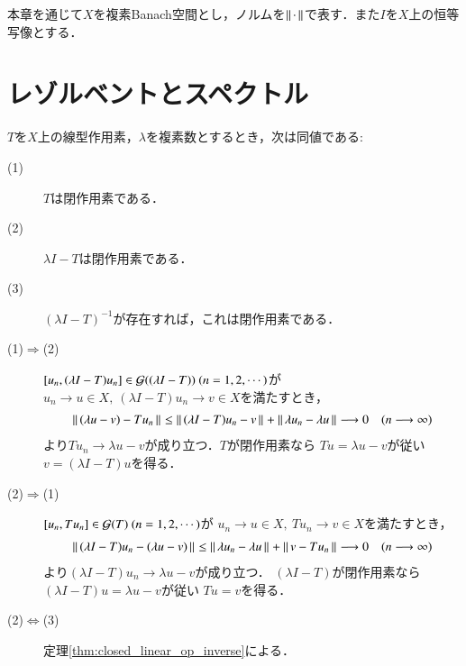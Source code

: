 本章を通じて$X$を複素Banach空間とし，ノルムを$\left\|\, \cdot\, \right\|_{}$で表す．また$I$を$X$上の恒等写像とする．

\section{レゾルベントとスペクトル}
	\begin{screen}
		\begin{lem}[レゾルベントは閉作用素]
			$T$を$X$上の線型作用素，$\lambda$を複素数とするとき，次は同値である:
			\begin{description}
				\item[(1)] $T$は閉作用素である．
				\item[(2)] $\lambda I - T$は閉作用素である．
				\item[(3)] $(\lambda I - T)^{-1}$が存在すれば，これは閉作用素である．
			\end{description}
		\end{lem}
	\end{screen}
	
	\begin{prf}\mbox{}
		\begin{description}
			\item[(1)$\Rightarrow$(2)]
				$[u_n,(\lambda I - T) u_n] \in \Graph{(\lambda I - T)} \ (n=1,2,\cdots)$が
				$u_n \longrightarrow u \in X,\ (\lambda I - T) u_n \longrightarrow v \in X$を満たすとき，
				\begin{align}
					\left\|\, (\lambda u - v) - T u_n\, \right\|_{}
					\leq \left\|\, (\lambda I - T) u_n - v\, \right\|_{} + \left\|\, \lambda u_n - \lambda u\, \right\|_{}
					\longrightarrow 0 \quad (n \longrightarrow \infty)
				\end{align}
				より$T u_n \longrightarrow \lambda u - v$が成り立つ．$T$が閉作用素なら
				$T u = \lambda u - v$が従い$v = (\lambda I - T) u$を得る．
				
			\item[(2)$\Rightarrow$(1)]
				$[u_n,T u_n] \in \Graph{T} \ (n=1,2,\cdots)$が
				$u_n \longrightarrow u \in X,\ T u_n \longrightarrow v \in X$を満たすとき，
				\begin{align}
					\left\|\, (\lambda I - T)u_n - (\lambda u - v)\, \right\|_{}
					\leq \left\|\, \lambda u_n - \lambda u\, \right\|_{} + \left\|\, v - T u_n\, \right\|_{}
					\longrightarrow 0 \quad (n \longrightarrow \infty)
				\end{align}
				より$(\lambda I - T)u_n \longrightarrow \lambda u - v$が成り立つ．
				$(\lambda I - T)$が閉作用素なら$(\lambda I - T)u = \lambda u - v$が従い
				$T u = v$を得る．
				
			\item[(2)$\Leftrightarrow$(3)]
				定理\ref{thm:closed_linear_op_inverse}による．
				\QED
		\end{description}
	\end{prf}